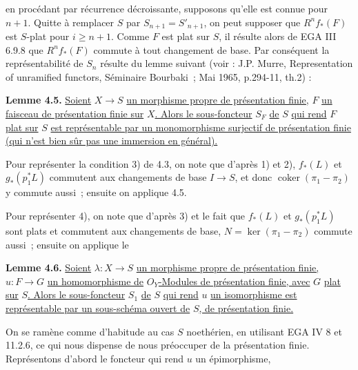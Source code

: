 
en procédant par récurrence décroissante, supposons qu'elle est connue pour \(n+1\). Quitte à remplacer \(S\) par \(S_{n+1}=S'_{n+1}\), on peut supposer que \(R^nf_*(F)\) est \(S\)-plat pour \(i\ge n+1\). Comme \(F\) est plat sur \(S\), il résulte alors de EGA III 6.9.8 que \(R^nf_*(F)\) commute à tout changement de base. Par conséquent la représentabilité de \(S_n\) résulte du lemme suivant (voir : J.P. Murre, Representation of unramified functors, Séminaire Bourbaki~; Mai 1965, p.294-11, th.2) :

\textbf{Lemme 4.5.} \uline{Soient} \(X\to S\) \uline{un morphisme propre de présentation finie,} \(F\) \uline{un faisceau de présentation finie sur} \(X\)\uline{. Alors le sous-foncteur} \(S_F\) \uline{de} \(S\) \uline{qui rend} \(F\) \uline{plat sur} \(S\) \uline{est représentable par un monomorphisme surjectif de présentation finie (qui n'est bien sûr pas une immersion en général).}

Pour représenter la condition 3) de 4.3, on note que d'après 1) et 2), \(f_*(L)\) et \(g_*(p_1^*L)\) commutent aux changements de base \(I\to S\), et donc \(\operatorname{coker}(\pi_1-\pi_2)\) y commute aussi~; ensuite on applique 4.5.

Pour représenter 4), on note que d'après 3) et le fait que \(f_*(L)\) et \(g_*(p_1^*L)\) sont plats et commutent aux changements de base, \(N=\ker(\pi_1-\pi_2)\) commute aussi~; ensuite on applique le

\textbf{Lemme 4.6.} \uline{Soient} \(\lambda:X\to S\) \uline{un morphisme propre de présentation finie,} \(u:F\to G\) \uline{un homomorphisme de} \({O}_Y\)\uline{-Modules de présentation finie, avec} \(G\) \uline{plat sur} \(S\)\uline{. Alors le sous-foncteur} \(S_1\) \uline{de} \(S\) \uline{qui rend} \(u\) \uline{un isomorphisme est représentable par un sous-schéma ouvert de} \(S\)\uline{, de présentation finie.}

On se ramène comme d'habitude au cas \(S\) noethérien, en utilisant EGA IV 8 et 11.2.6, ce qui nous dispense de nous préoccuper de la présentation finie. Représentons d'abord le foncteur qui rend \(u\) un épimorphisme,
